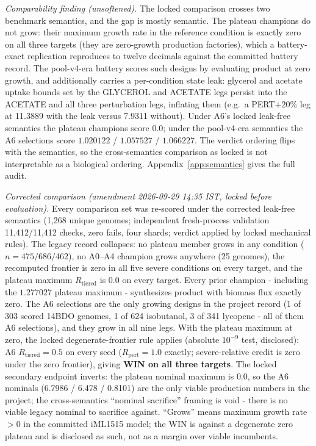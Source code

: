 \documentclass[12pt,a4paper]{article}
\begin{document}
\textit{Comparability finding (unsoftened).} The locked comparison crosses two benchmark semantics, and the gap is mostly semantic. The plateau champions do not grow: their maximum growth rate in the reference condition is exactly zero on all three targets (they are zero-growth production factories), which a battery-exact replication reproduces to twelve decimals against the committed battery record. The pool-v4-era battery scores such designs by evaluating product at zero growth, and additionally carries a per-condition state leak: glycerol and acetate uptake bounds set by the GLYCEROL and ACETATE legs persist into the ACETATE and all three perturbation legs, inflating them (e.g.\ a PERT$+20$\% leg at 11.3889 with the leak versus 7.9311 without). Under A6's locked leak-free semantics the plateau champions score $0.0$; under the pool-v4-era semantics the A6 selections score $1.020122$ / $1.057527$ / $1.066227$. The verdict ordering flips with the semantics, so the cross-semantics comparison as locked is not interpretable as a biological ordering. Appendix~\ref{app:semantics} gives the full audit.

\textit{Corrected comparison (amendment 2026-09-29 14:35 IST, locked before evaluation).} Every comparison set was re-scored under the corrected leak-free semantics (1,268 unique genomes; independent fresh-process validation 11,412/11,412 checks, zero fails, four shards; verdict applied by locked mechanical rules). The legacy record collapses: no plateau member grows in any condition ($n = 475/686/462$), no A0--A4 champion grows anywhere (25 genomes), the recomputed frontier is zero in all five severe conditions on every target, and the plateau maximum $R_{\mathrm{tiered}}$ is $0.0$ on every target. Every prior champion - including the $1.277027$ plateau maximum - synthesizes product with biomass flux exactly zero. The A6 selections are the only growing designs in the project record (1 of 303 scored 14BDO genomes, 1 of 624 isobutanol, 3 of 341 lycopene - all of them A6 selections), and they grow in all nine legs. With the plateau maximum at zero, the locked degenerate-frontier rule applies (absolute $10^{-9}$ test, disclosed): A6 $R_{\mathrm{tiered}} = 0.5$ on every seed ($R_{\mathrm{pert}} = 1.0$ exactly; severe-relative credit is zero under the zero frontier), giving \textbf{WIN on all three targets}. The locked secondary endpoint inverts: the plateau nominal maximum is $0.0$, so the A6 nominals (6.7986 / 6.478 / 0.8101) are the only viable production numbers in the project; the cross-semantics ``nominal sacrifice'' framing is void - there is no viable legacy nominal to sacrifice against. ``Grows'' means maximum growth rate $> 0$ in the committed iML1515 model; the WIN is against a degenerate zero plateau and is disclosed as such, not as a margin over viable incumbents.
\end{document}
